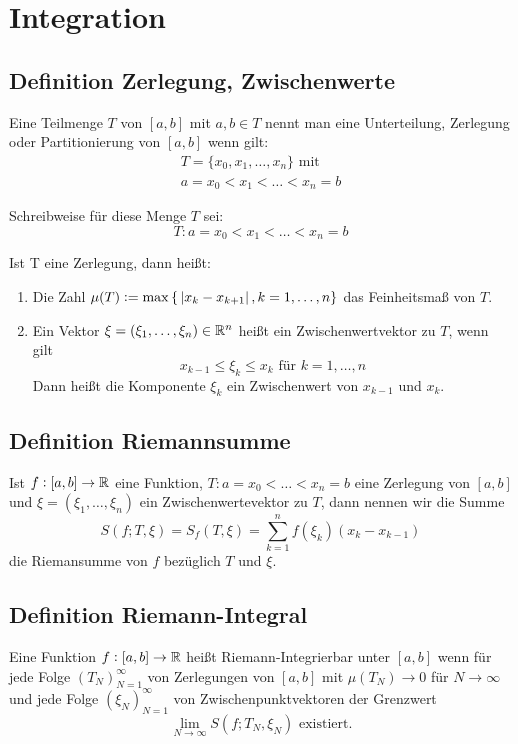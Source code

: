 \section{Integration}

\subsection{Definition Zerlegung, Zwischenwerte}
Eine Teilmenge $T$ von $[a,b]$ mit $a, b \in T$ nennt man eine
Unterteilung, Zerlegung oder Partitionierung von $[a, b]$ wenn
gilt:
\begin{eqnarray*}
    T = \{ x_0, x_1, \ldots , x_n\} \text{ mit}\\
    a = x_0 < x_1 < \ldots < x_n = b
\end{eqnarray*}

Schreibweise für diese Menge $T$ sei:
\begin{equation*}
    T: a = x_0 < x_1 < \ldots < x_n = b
\end{equation*}

Ist T eine Zerlegung, dann heißt:
\begin{enumerate}[label= (\alph*)]
    \item Die Zahl $\mu(T) :=
        \max{ \{\ \abs{x_k - x_{k+1}}, k = 1, \ldots, n \} }$
        das Feinheitsmaß von $T$.
    \item Ein Vektor $\xi = (\xi_1, \ldots, \xi_n) \in \mathbb{R}^n$ heißt
        ein Zwischenwertvektor zu $T$, wenn gilt
        \begin{equation*}
            x_{k-1} \leq \xi_k \leq x_k \text{ für } k = 1, \ldots, n
        \end{equation*}
        Dann heißt die Komponente $\xi_k$ ein Zwischenwert von
        $x_{k-1}$ und $x_k$.
\end{enumerate}

\subsection{Definition Riemannsumme}
Ist $f: [a,b] \rightarrow \mathbb{R}$ eine Funktion, $T: a=x_0<\ldots<x_n=b$
eine Zerlegung von $[a, b]$ und $\xi = (\xi_1, \ldots, \xi_n)$ ein
Zwischenwertevektor zu $T$, dann nennen wir die Summe
\begin{equation*}
    S(f; T, \xi) = S_f(T, \xi) = \sum_{k=1}^n f(\xi_k)(x_k - x_{k-1})
\end{equation*}
die Riemansumme von $f$ bezüglich $T$ und $\xi$.

\subsection{Definition Riemann-Integral}
Eine Funktion $f: [a, b] \rightarrow \mathbb{R}$ heißt Riemann-Integrierbar
unter $[a, b]$ wenn für jede Folge ${(T_N)}_{N=1}^\infty$ von Zerlegungen
von $[a,b]$ mit $\mu(T_N) \rightarrow 0$ für $N \rightarrow \infty$
und jede Folge ${(\xi_N)}_{N=1}^\infty$ von Zwischenpunktvektoren
der Grenzwert
\begin{equation*}
    \lim_{N \rightarrow \infty} S(f; T_N, \xi_N) \text{ existiert.}
\end{equation*}

